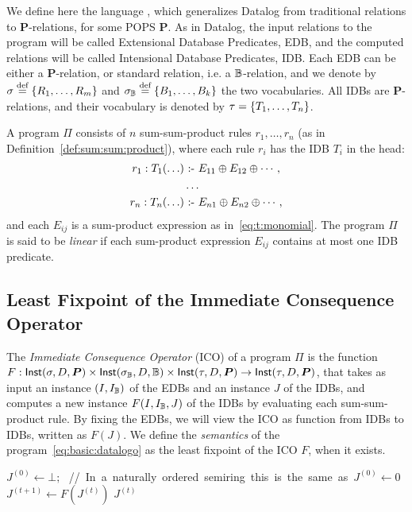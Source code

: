 We define here the language \datalogo, which generalizes Datalog from
traditional relations to $\bm P$-relations, for some POPS $\bm P$.  As
in Datalog, the input relations to the program will be called
Extensional Database Predicates, EDB, and the computed relations will
be called Intensional Database Predicates, IDB.  Each EDB can be
either a $\bm P$-relation, or standard relation, i.e. a $\mathbb B$-relation,
and we denote by $\sigma \stackrel{\text{def}}{=} \{R_1, \ldots, R_m\}$ and
$\sigma_\mathbb B \stackrel{\text{def}}{=} \{B_1, \ldots, B_k\}$ the two vocabularies.  All
IDBs are $\bm P$-relations, and their vocabulary is denoted by
$\tau = \{T_1, \ldots, T_n\}$.

A \datalogo program $\Pi$ consists of $n$ sum-sum-product rules
$r_1, \ldots, r_n$ (as in Definition~\ref{def:sum:sum:product}), where
each rule $r_i$ has the IDB $T_i$ in the head:
%
\begin{align}
  r_1: T_1(\ldots) & \text{ :- } E_{11}\oplus E_{12} \oplus \cdots, \nonumber \\
       & \ldots \label{eq:basic:datalogo} \\
  r_n: T_n(\ldots) & \text{ :- } E_{n1} \oplus E_{n2} \oplus \cdots, \nonumber
\end{align}
%
and each $E_{ij}$ is a sum-product expression as
in~\eqref{eq:t:monomial}.  The program $\Pi$ is said to be {\em
  linear} if each sum-product expression $E_{ij}$ contains at most one
IDB predicate.

\subsection{Least Fixpoint of the Immediate Consequence Operator}

\label{subsec:ico}

The {\em Immediate Consequence Operator} (ICO) of a program
$\Pi$ is the function
$F : \textsf{Inst}(\sigma,D,\bm P) \times \textsf{Inst}(\sigma_\mathbb B,D,\mathbb B) \times
\textsf{Inst}(\tau,D,\bm P) \rightarrow \textsf{Inst}(\tau,D,\bm P)$, that takes as
input an instance $(I, I_\mathbb B)$ of the EDBs and an instance $J$ of the
IDBs, and computes a new instance $F(I,I_\mathbb B,J)$ of the IDBs by
evaluating each sum-sum-product rule.  By fixing the EDBs, we will
view the ICO as function from IDBs to IDBs, written as $F(J)$.
 We define the {\em semantics} of the \datalogo
program~\eqref{eq:basic:datalogo} as the least fixpoint of the ICO
$F$, when it exists.

\begin{algorithm}[th]
     $J^{(0)} \leftarrow \bot\mbox{;}$ \mbox{\hspace{2cm} // In a naturally ordered  semiring this is the same as $J^{(0)} \leftarrow 0$}\\
    {
         {$J^{(t+1)} \leftarrow F(J^{(t)})$}\;
    }
    \Return $J^{(t)}$
    \caption{Na\"ive evaluation for \datalogo
    }
    \label{algo:naive}
\end{algorithm}

